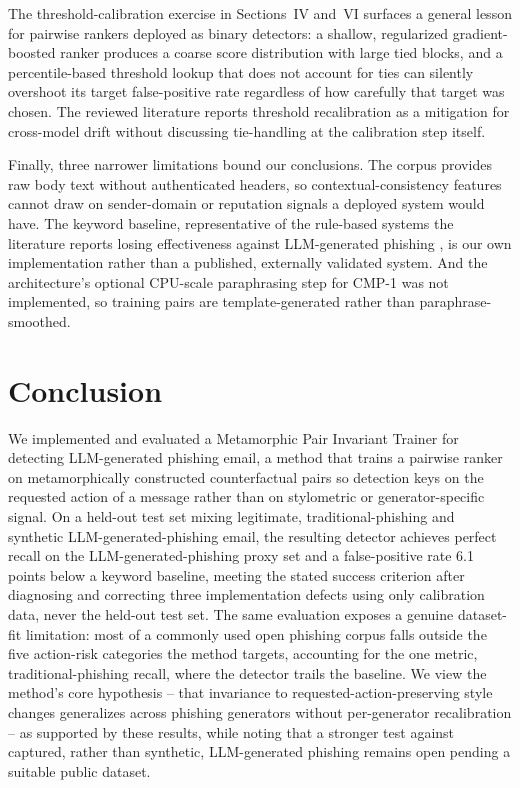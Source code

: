 \documentclass[conference]{IEEEtran}
\begin{document}
The threshold-calibration exercise in Sections~IV and~VI surfaces a general lesson for pairwise rankers deployed as binary detectors: a shallow, regularized gradient-boosted ranker produces a coarse score distribution with large tied blocks, and a percentile-based threshold lookup that does not account for ties can silently overshoot its target false-positive rate regardless of how carefully that target was chosen. The reviewed literature reports threshold recalibration as a mitigation for cross-model drift \cite{S1} without discussing tie-handling at the calibration step itself.

Finally, three narrower limitations bound our conclusions. The corpus provides raw body text without authenticated headers, so contextual-consistency features cannot draw on sender-domain or reputation signals a deployed system would have. The keyword baseline, representative of the rule-based systems the literature reports losing effectiveness against LLM-generated phishing \cite{S1,S3,S5}, is our own implementation rather than a published, externally validated system. And the architecture's optional CPU-scale paraphrasing step for CMP-1 was not implemented, so training pairs are template-generated rather than paraphrase-smoothed.

\section{Conclusion}

We implemented and evaluated a Metamorphic Pair Invariant Trainer for detecting LLM-generated phishing email, a method that trains a pairwise ranker on metamorphically constructed counterfactual pairs so detection keys on the requested action of a message rather than on stylometric or generator-specific signal. On a held-out test set mixing legitimate, traditional-phishing and synthetic LLM-generated-phishing email, the resulting detector achieves perfect recall on the LLM-generated-phishing proxy set and a false-positive rate 6.1 points below a keyword baseline, meeting the stated success criterion after diagnosing and correcting three implementation defects using only calibration data, never the held-out test set. The same evaluation exposes a genuine dataset-fit limitation: most of a commonly used open phishing corpus falls outside the five action-risk categories the method targets, accounting for the one metric, traditional-phishing recall, where the detector trails the baseline. We view the method's core hypothesis -- that invariance to requested-action-preserving style changes generalizes across phishing generators without per-generator recalibration -- as supported by these results, while noting that a stronger test against captured, rather than synthetic, LLM-generated phishing remains open pending a suitable public dataset.



\end{document}
